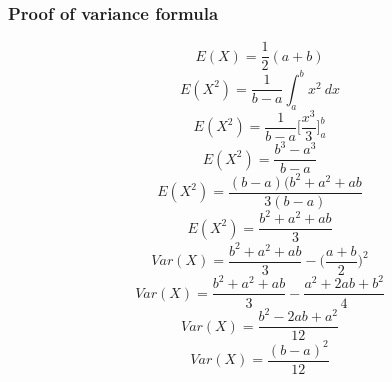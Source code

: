 \documentclass{article}[18pt]
\begin{document}
\subsubsection{Proof of variance formula}
$$E(X)=\frac{1}{2}(a+b)$$
$$E(X^2)=\frac{1}{b-a}\int^b_a x^2\ dx$$
$$E(X^2)=\frac{1}{b-a}\Bigg[\frac{x^3}{3}\Bigg]^b_a$$
$$E(X^2)=\frac{b^3-a^3}{b-a}$$
$$E(X^2)=\frac{(b-a)(b^2+a^2+ab}{3(b-a)}$$
$$E(X^2)=\frac{b^2+a^2+ab}{3}$$
$$Var(X)=\frac{b^2+a^2+ab}{3}-\Big(\frac{a+b}{2}\Big)^2$$
$$Var(X)=\frac{b^2+a^2+ab}{3}-\frac{a^2+2ab+b^2}{4}$$
$$Var(X)=\frac{b^2-2ab+a^2}{12}$$
$$Var(X)=\frac{(b-a)^2}{12}$$
\end{document}
